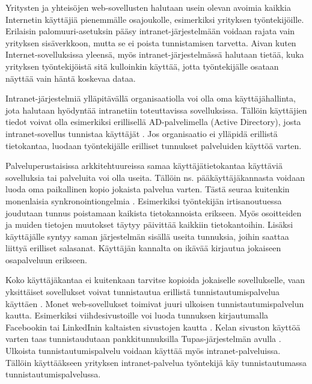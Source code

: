 Yritysten ja yhteisöjen web-sovellusten halutaan usein olevan avoimia kaikkia Internetin käyttäjiä pienemmälle osajoukolle, esimerkiksi yrityksen työntekijöille. Erilaisin palomuuri-asetuksin pääsy intranet-järjestelmään voidaan rajata vain yrityksen sisäverkkoon, mutta se ei poista tunnistamisen tarvetta. Aivan kuten Internet-sovelluksissa yleensä, myös intranet-järjestelmässä halutaan tietää, kuka yrityksen työntekijöistä sitä kulloinkin käyttää, jotta työntekijälle osataan näyttää vain häntä koskevaa dataa.

Intranet-järjestelmiä ylläpitävällä organisaatiolla voi olla oma käyttäjähallinta, jota halutaan hyödyntää intranetiin toteuttavissa sovelluksissa. Tällöin käyttäjien tiedot voivat olla esimerkiksi erillisellä AD-palvelimella (Active Directory), josta intranet-sovellus tunnistaa käyttäjät \cite{active_directory}. Jos organisaatio ei ylläpidä erillistä tietokantaa, luodaan työntekijälle erilliset tunnukset palveluiden käyttöä varten.

Palveluperustaisissa arkkitehtuureissa samaa käyttäjätietokantaa käyttäviä sovelluksia tai palveluita voi olla useita. Tällöin ns. pääkäyttäjäkannasta voidaan luoda oma paikallinen kopio jokaista palvelua varten. Tästä seuraa kuitenkin monenlaisia synkronointiongelmia \cite{synkronointi}. Esimerkiksi työntekijän irtisanoutuessa joudutaan tunnus poistamaan kaikista tietokannoista erikseen. Myös osoitteiden ja muiden tietojen muutokset täytyy päivittää kaikkiin tietokantoihin. Lisäksi käyttäjälle syntyy saman järjestelmän sisällä useita tunnuksia, joihin saattaa liittyä erilliset salasanat. Käyttäjän kannalta on ikävää kirjautua jokaiseen osapalveluun erikseen.

Koko käyttäjäkantaa ei kuitenkaan tarvitse kopioida jokaiselle sovellukselle, vaan yksittäiset sovellukset voivat tunnistautua erillistä tunnistautumispalvelua käyttäen \cite{facebook}. Monet web-sovellukset toimivat juuri ulkoisen tunnistautumispalvelun kautta. Esimerkiksi viihdesivustoille voi luoda tunnuksen kirjautumalla Facebookin tai LinkedInin kaltaisten sivustojen kautta \cite{facebook}. Kelan sivuston käyttöä varten taas tunnistaudutaan pankkitunnuksilla Tupas-järjestelmän avulla \cite{tupas}. Ulkoista tunnistautumispalvelu voidaan käyttää myös intranet-palveluissa. Tällöin käyttääkseen yrityksen intranet-palvelua työntekijä käy tunnistautumassa tunnistautumispalvelussa.